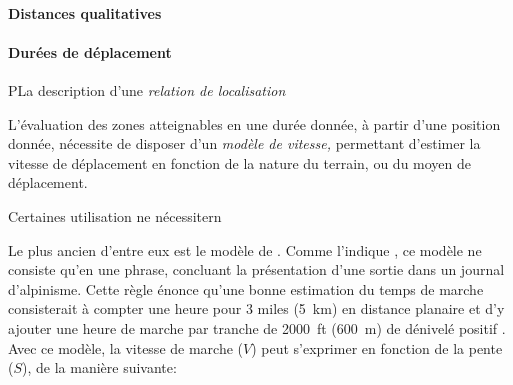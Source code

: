 \paragraph{Distances qualitatives}



\paragraph{Durées de déplacement}




PLa description d'une \emph{relation de localisation}

L'évaluation des zones atteignables en une durée donnée, à partir
d'une position donnée, nécessite de disposer d'un \emph{modèle de
  vitesse,} permettant d'estimer la vitesse de déplacement en fonction
de la nature du terrain, ou du moyen de déplacement.


Certaines utilisation ne nécessitern

Le plus ancien d'entre eux est le modèle de
\textcite{Naismith1892}. Comme l'indique \textcite{Duchene2019}, ce
modèle ne consiste qu'en une phrase, concluant la présentation d'une
sortie dans un journal d'alpinisme. Cette règle énonce qu'une bonne
estimation du temps de marche consisterait à compter une heure pour 3
miles (\SI{5}{\kilo\meter}) en distance planaire et d'y ajouter une
heure de marche par tranche de \SI{2000}{ft} (\SI{600}{\meter}) de
dénivelé positif \autocite{Naismith1892}. Avec ce modèle, la vitesse
de marche (\(V\)) peut s'exprimer en fonction de la pente (\(S\)), de
la manière suivante:

